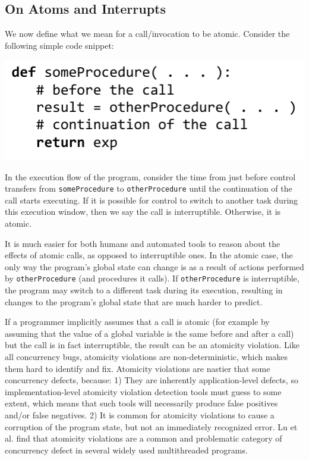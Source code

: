 \documentclass[preprint, 10pt, numbers]{sigplanconf}
\begin{document}
\subsection{On Atoms and Interrupts}

We now define what we mean for a call/invocation to be atomic.
Consider the following simple code snippet\footnotemark{}:

\noindent
\includegraphics[scale=0.7]{trivial_call}


In the execution flow of the program, consider the time from just before control transfers from \texttt{someProcedure} to \texttt{otherProcedure} until the continuation of the call starts executing.
If it is possible for control to switch to another task during this execution window, then we say the call is interruptible.
Otherwise, it is atomic.

It is much easier for both humans and automated tools to reason about the effects of atomic calls, as opposed to interruptible ones.
In the atomic case, the only way the program's global state can change is as a result of actions performed by \texttt{otherProcedure} (and procedures it calls).
If \texttt{otherProcedure} is interruptible, the program may switch to a different task during its execution, resulting in changes to the program's global state that are much harder to predict.

If a programmer implicitly assumes that a call is atomic (for example by assuming that the value of a global variable is the same before and after a call) but the call is in fact interruptible, the result can be an atomicity violation.
Like all concurrency bugs, atomicity violations are non-deterministic, which makes them hard to identify and fix.
Atomicity violations are nastier that some concurrency defects, because:
1) They are inherently application-level defects, so implementation-level atomicity violation detection tools must guess to some extent, which means that such tools will necessarily produce false positives and/or false negatives.
2) It is common for atomicity violations to cause a corruption of the program state, but not an immediately recognized error.
Lu et al. \cite{Lu2008} find that atomicity violations are a common and problematic category of concurrency defect in several widely used multithreaded programs.
\end{document}
